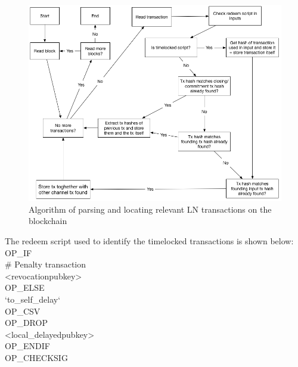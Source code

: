 \begin{figure}[h]
    \centering
    \includegraphics[width=14cm]{figures/algorithm.png}
    \caption{Algorithm of parsing and locating relevant LN transactions on the blockchain}
    \label{fig:algo}
\end{figure}


The redeem script used to identify the timelocked transactions is shown below: \cite{bolt3}
\\

\noindent OP\_IF \\
\indent   # Penalty transaction \\
\indent    <revocationpubkey> \\
OP\_ELSE\\
\indent    `to\_self\_delay`\\
\indent    OP\_CSV\\
\indent    OP\_DROP\\
\indent    <local\_delayedpubkey>\\
OP\_ENDIF\\
OP\_CHECKSIG\\

